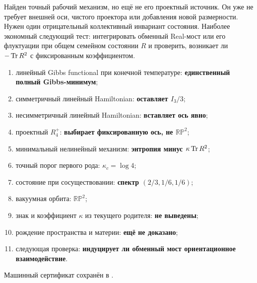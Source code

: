 Найден точный рабочий механизм, но ещё не его проектный источник. Он уже
не требует внешней оси, чистого проектора или добавления новой размерности.
Нужен один отрицательный коллективный инвариант состояния. Наиболее
экономный следующий тест: интегрировать обменный Real-мост или его
флуктуации при общем семейном состоянии $R$ и проверить, возникает ли
$-\operatorname{Tr} R^2$ с фиксированным коэффициентом.

\begin{protocol}
\begin{enumerate}
 \item линейный Gibbs functional при конечной температуре:
 \textbf{единственный полный Gibbs-минимум};
 \item симметричный линейный Hamiltonian:
 \textbf{оставляет $I_3/3$};
 \item несимметричный линейный Hamiltonian:
 \textbf{вставляет ось явно};
 \item проектный $R_4^+$:
 \textbf{выбирает фиксированную ось, не $\mathbb{RP}^2$};
 \item минимальный нелинейный механизм:
 \textbf{энтропия минус $\kappa\operatorname{Tr} R^2$};
 \item точный порог первого рода:
 \textbf{$\kappa_c=\log4$};
 \item состояние при сосуществовании:
 \textbf{спектр $(2/3,1/6,1/6)$};
 \item вакуумная орбита:
 \textbf{$\mathbb{RP}^2$};
 \item знак и коэффициент $\kappa$ из текущего родителя:
 \textbf{не выведены};
 \item рождение пространства и материи:
 \textbf{ещё не доказано};
 \item следующая проверка:
 \textbf{индуцирует ли обменный мост ориентационное взаимодействие}.
\end{enumerate}
\end{protocol}

Машинный сертификат сохранён в
.